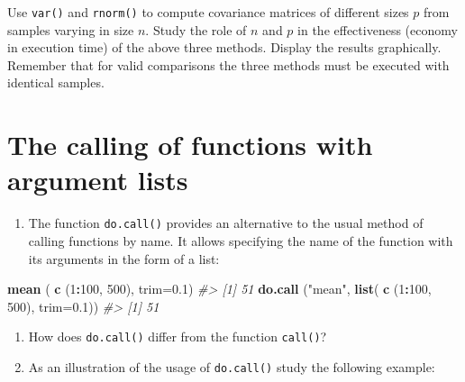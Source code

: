 \documentclass[
]{book}
\newenvironment{Shaded}{\begin{snugshade}}{\end{snugshade}}
\newcommand{\AttributeTok}[1]{\textcolor[rgb]{0.13,0.29,0.53}{#1}}
\newcommand{\CommentTok}[1]{\textcolor[rgb]{0.56,0.35,0.01}{\textit{#1}}}
\newcommand{\DecValTok}[1]{\textcolor[rgb]{0.00,0.00,0.81}{#1}}
\newcommand{\FloatTok}[1]{\textcolor[rgb]{0.00,0.00,0.81}{#1}}
\newcommand{\FunctionTok}[1]{\textcolor[rgb]{0.13,0.29,0.53}{\textbf{#1}}}
\newcommand{\NormalTok}[1]{#1}
\newcommand{\SpecialCharTok}[1]{\textcolor[rgb]{0.81,0.36,0.00}{\textbf{#1}}}
\newcommand{\StringTok}[1]{\textcolor[rgb]{0.31,0.60,0.02}{#1}}
\providecommand{\tightlist}{%
  \setlength{\itemsep}{0pt}\setlength{\parskip}{0pt}}
\begin{document}
Use \texttt{var()} and \texttt{rnorm()} to compute covariance matrices of different sizes \(p\) from samples varying in size \(n\). Study the role of \(n\) and \(p\) in the effectiveness (economy in execution time) of the above three methods. Display the results graphically. Remember that for valid comparisons the three methods must be executed with identical samples.

\section{The calling of functions with argument lists}\label{the-calling-of-functions-with-argument-lists}

\begin{enumerate}
\def\labelenumi{(\alph{enumi})}
\tightlist
\item
  The function \texttt{do.call()} provides an alternative to the usual method of calling functions by name. It allows specifying the name of the function with its arguments in the form of a list:
\end{enumerate}

\begin{Shaded}
\begin{Highlighting}[]
\FunctionTok{mean}\NormalTok{ ( }\FunctionTok{c}\NormalTok{ (}\DecValTok{1}\SpecialCharTok{:}\DecValTok{100}\NormalTok{, }\DecValTok{500}\NormalTok{), }\AttributeTok{trim=}\FloatTok{0.1}\NormalTok{)}
\CommentTok{\#\textgreater{} [1] 51}
\FunctionTok{do.call}\NormalTok{ (}\StringTok{"mean"}\NormalTok{, }\FunctionTok{list}\NormalTok{( }\FunctionTok{c}\NormalTok{ (}\DecValTok{1}\SpecialCharTok{:}\DecValTok{100}\NormalTok{, }\DecValTok{500}\NormalTok{), }\AttributeTok{trim=}\FloatTok{0.1}\NormalTok{))}
\CommentTok{\#\textgreater{} [1] 51}
\end{Highlighting}
\end{Shaded}

\begin{enumerate}
\def\labelenumi{(\alph{enumi})}
\setcounter{enumi}{1}
\item
  How does \texttt{do.call()} differ from the function \texttt{call()}?
\item
  As an illustration of the usage of \texttt{do.call()} study the following example:
\end{enumerate}
\end{document}
